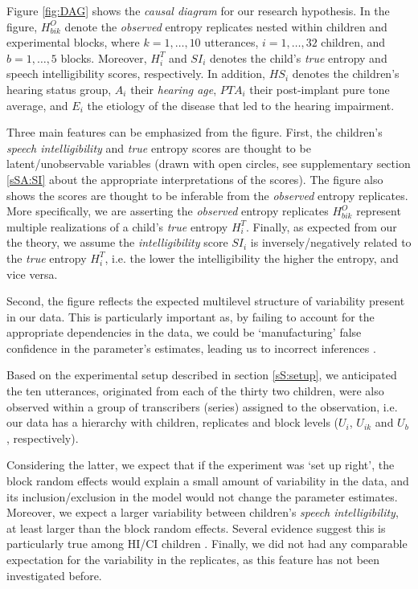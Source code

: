 Figure \ref{fig:DAG} shows the \textit{causal diagram} for our research hypothesis. In the figure, $H^{O}_{bik}$ denote the \textit{observed} entropy replicates nested within children and experimental blocks, where $k=1,\dots,10$ utterances, $i=1,\dots,32$ children, and $b=1,\dots,5$ blocks. Moreover, $H^{T}_{i}$ and $SI_{i}$ denotes the child's \textit{true} entropy and speech intelligibility scores, respectively. In addition, $HS_{i}$ denotes the children's hearing status group, $A_{i}$ their \textit{hearing age}, $PTA_{i}$ their post-implant pure tone average, and $E_{i}$ the etiology of the disease that led to the hearing impairment.

Three main features can be emphasized from the figure. First, the children's \textit{speech intelligibility} and \textit{true} entropy scores are thought to be latent/unobservable variables \cite{Everitt_1984} (drawn with open circles, see supplementary section \ref{sSA:SI} about the appropriate interpretations of the scores). The figure also shows the scores are thought to be inferable from the \textit{observed} entropy replicates. More specifically, we are asserting the \textit{observed} entropy replicates $H^{O}_{bik}$ represent multiple realizations of a child's \textit{true} entropy $H^{T}_{i}$. Finally, as expected from our the theory, we assume the \textit{intelligibility} score $SI_{i}$ is inversely/negatively related to the \textit{true} entropy $H^{T}_{i}$, i.e. the lower the intelligibility the higher the entropy, and vice versa. 

Second, the figure reflects the expected multilevel structure of variability present in our data. This is particularly important as, by failing to account for the appropriate dependencies in the data, we could be `manufacturing' false confidence in the parameter's estimates, leading us to incorrect inferences \cite{McElreath_2020}. 

Based on the experimental setup described in section \ref{sS:setup}, we anticipated the ten utterances, originated from each of the thirty two children, were also observed within a group of transcribers (series) assigned to the observation, i.e. our data has a hierarchy with children, replicates and block levels ($U_{i}$, $U_{ik}$ and $U_{b}$, respectively). 

Considering the latter, we expect that if the experiment was `set up right', the block random effects would explain a small amount of variability in the data, and its inclusion/exclusion in the model would not change the parameter estimates. Moreover, we expect a larger variability between children's \textit{speech intelligibility}, at least larger than the block random effects. Several evidence suggest this is particularly true among HI/CI children \cite{Young_et_al_2002, Peng_et_al_2004, Montag_et_al_2014, Castellanos_et_al_2014, Yanbay_et_al_2014, Nittrouer_et_al_2014, Freeman_et_al_2017}. Finally, we did not had any comparable expectation for the variability in the replicates, as this feature has not been investigated before.

